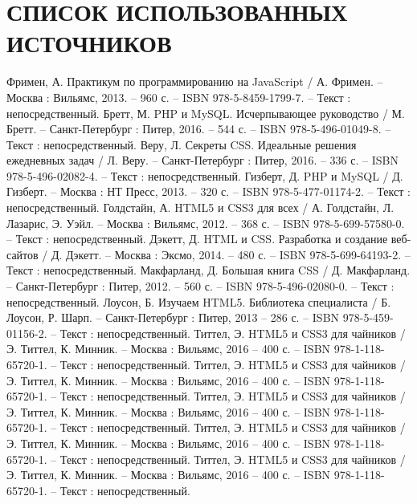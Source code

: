 \newpage
\section*{СПИСОК ИСПОЛЬЗОВАННЫХ ИСТОЧНИКОВ}
  \begin{thebibliography}{9}

     Фримен, А. Практикум по программированию на JavaScript / А. Фримен. – Москва : Вильямс, 2013. – 960 с. – ISBN 978-5-8459-1799-7. – Текст : непосредственный.
     Бретт, М. PHP и MySQL. Исчерпывающее руководство / М. Бретт. – Санкт-Петербург : Питер, 2016. – 544 с. – ISBN 978-5-496-01049-8. – Текст : непосредственный.
     Веру, Л. Секреты CSS. Идеальные решения ежедневных задач / Л. Веру. – Санкт-Петербург : Питер, 2016. – 336 с. – ISBN 978-5-496-02082-4. – Текст : непосредственный.
    	Гизберт, Д. PHP и MySQL / Д. Гизберт. – Москва : НТ Пресс, 2013. – 320 с. – ISBN 978-5-477-01174-2. – Текст : непосредственный.
		Голдстайн, А. HTML5 и CSS3 для всех / А. Голдстайн, Л. Лазарис, Э. Уэйл. – Москва : Вильямс, 2012. – 368 с. – ISBN 978-5-699-57580-0. – Текст : непосредственный.
		Дэкетт, Д. HTML и CSS. Разработка и создание веб-сайтов / Д. Дэкетт. – Москва : Эксмо, 2014. – 480 с. – ISBN 978-5-699-64193-2. – Текст : непосредственный.
		Макфарланд, Д. Большая книга CSS / Д. Макфарланд. – Санкт-Петербург : Питер, 2012. – 560 с. – ISBN 978-5-496-02080-0. – Текст : непосредственный.
		Лоусон, Б. Изучаем HTML5. Библиотека специалиста / Б. Лоусон, Р. Шарп. – Санкт-Петербург : Питер, 2013 – 286 с. – ISBN 978-5-459-01156-2. – Текст : непосредственный.
		Титтел, Э. HTML5 и CSS3 для чайников / Э. Титтел, К. Минник. – Москва : Вильямс, 2016 – 400 с. – ISBN 978-1-118-65720-1. – Текст : непосредственный.    
		Титтел, Э. HTML5 и CSS3 для чайников / Э. Титтел, К. Минник. – Москва : Вильямс, 2016 – 400 с. – ISBN 978-1-118-65720-1. – Текст : непосредственный.    
			Титтел, Э. HTML5 и CSS3 для чайников / Э. Титтел, К. Минник. – Москва : Вильямс, 2016 – 400 с. – ISBN 978-1-118-65720-1. – Текст : непосредственный.    
				Титтел, Э. HTML5 и CSS3 для чайников / Э. Титтел, К. Минник. – Москва : Вильямс, 2016 – 400 с. – ISBN 978-1-118-65720-1. – Текст : непосредственный.    
				Титтел, Э. HTML5 и CSS3 для чайников / Э. Титтел, К. Минник. – Москва : Вильямс, 2016 – 400 с. – ISBN 978-1-118-65720-1. – Текст : непосредственный.    
  \end{thebibliography}
